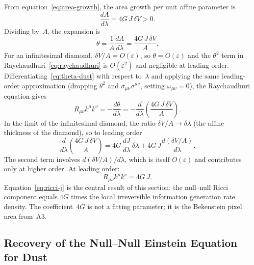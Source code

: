 \documentclass[12pt]{article}
\begin{document}
From equation~\eqref{eq:area-growth}, the area growth per
unit affine parameter is
\begin{equation}
  \frac{dA}{d\lambda} = 4G\,J\,\delta V > 0.
  \label{eq:dA-dlambda}
\end{equation}
Dividing by~$A$, the expansion is
\begin{equation}
  \theta = \frac{1}{A}\frac{dA}{d\lambda}
         = \frac{4G\,J\,\delta V}{A}.
  \label{eq:theta-dust}
\end{equation}
For an infinitesimal diamond, $\delta V/A = O(\varepsilon)$, so
$\theta = O(\varepsilon)$ and the $\theta^2$ term in
Raychaudhuri~\eqref{eq:raychaudhuri} is $O(\varepsilon^2)$
and negligible at leading order.
Differentiating~\eqref{eq:theta-dust} with respect to~$\lambda$
and applying the same leading-order approximation
(dropping $\theta^2$ and $\sigma_{\mu\nu}\sigma^{\mu\nu}$,
setting $\omega_{\mu\nu}=0$), the Raychaudhuri equation gives
\begin{equation}
  R_{\mu\nu}k^\mu k^\nu
  = -\frac{d\theta}{d\lambda}
  = -\frac{d}{d\lambda}\!\left(\frac{4G\,J\,\delta V}{A}\right).
  \label{eq:ricci-intermediate}
\end{equation}
In the limit of the infinitesimal diamond, the ratio
$\delta V / A \to \delta\lambda$ (the affine thickness of
the diamond), so to leading order
\begin{equation}
  \frac{d}{d\lambda}\!\left(\frac{4G\,J\,\delta V}{A}\right)
  = 4G\,\frac{dJ}{d\lambda}\,\delta\lambda
  + 4G\,J\frac{d(\delta V/A)}{d\lambda}.
\end{equation}
The second term involves $d(\delta V/A)/d\lambda$, which
is itself $O(\varepsilon)$ and contributes only at higher order.
At leading order:
\begin{equation}
  R_{\mu\nu}k^\mu k^\nu
  = 4G\,J.
  \label{eq:ricci-j}
\end{equation}
Equation~\eqref{eq:ricci-j} is the central result of this section:
the null--null Ricci component equals $4G$ times the local
irreversible information generation rate density.
The coefficient~$4G$ is not a fitting parameter; it is the
Bekenstein pixel area from~A3.

\subsection{Recovery of the Null--Null Einstein Equation for Dust}
\end{document}
